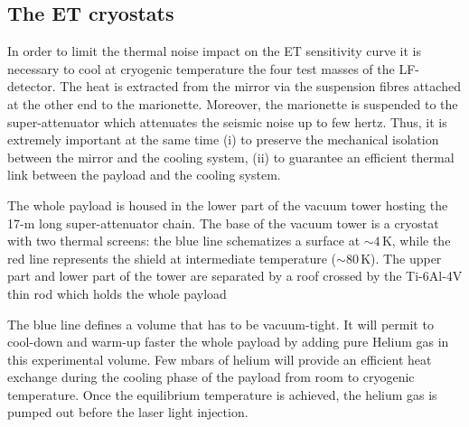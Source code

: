\subsection{The ET cryostats}
In order to limit the thermal noise impact on the ET sensitivity curve it is necessary to cool at cryogenic temperature the four test masses of the LF-detector. The heat is extracted from the mirror via the suspension fibres attached at the other end to the marionette. Moreover, the marionette is suspended to the super-attenuator which attenuates the seismic noise up to few hertz. Thus, it is extremely important at the same time (i) to preserve the mechanical isolation between the mirror and the cooling system, (ii) to guarantee an efficient thermal link between the payload and the cooling system. 


The whole payload is housed in the lower part of the vacuum tower hosting the 17-m long super-attenuator chain. The base of the vacuum tower is a cryostat with two thermal screens: the blue line schematizes a surface at $\sim4$\,K, while the red line represents the shield at intermediate temperature ($\sim 80$\,K). The upper part and lower part of the tower are separated by a roof crossed by the Ti-6Al-4V thin rod which holds the whole payload

The blue line defines a volume that has to be vacuum-tight. It will permit to cool-down and warm-up faster the whole payload by adding pure Helium gas in this experimental volume. Few mbars of helium will provide an efficient heat exchange during the cooling phase of the payload from room to cryogenic temperature. Once the equilibrium temperature is achieved, the helium gas is pumped out before the laser light injection. 

